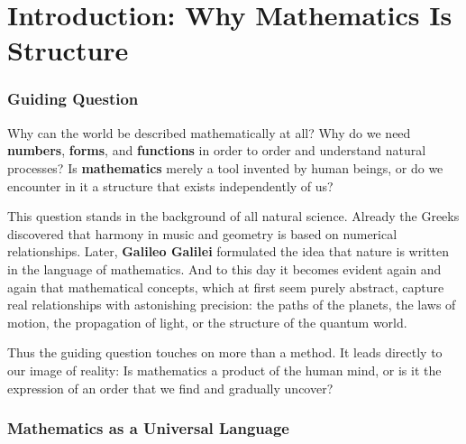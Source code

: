 \chapter{Introduction: Why Mathematics Is Structure}
\label{chap:I_introduction}

\setlength{\parindent}{0pt}

\subsection{Guiding Question}

Why can the world be described mathematically at all?
Why do we need \textbf{numbers}, \textbf{forms}, and \textbf{functions}
in order to order and understand natural processes?
Is \textbf{mathematics} merely a tool invented by human beings,
or do we encounter in it a structure
that exists independently of us?

This question stands in the background of all natural science.
Already the Greeks discovered
that harmony in music and geometry is based on numerical relationships.
Later, \textbf{Galileo Galilei} formulated the idea
that nature is written in the language of mathematics.
And to this day it becomes evident again and again
that mathematical concepts,
which at first seem purely abstract,
capture real relationships with astonishing precision:
the paths of the planets,
the laws of motion,
the propagation of light,
or the structure of the quantum world.

Thus the guiding question touches on more than a method.
It leads directly to our image of reality:
Is mathematics a product of the human mind,
or is it the expression of an order
that we find and gradually uncover?


\subsection{Mathematics as a Universal Language}
\label{sec:1.2_universal_language}

